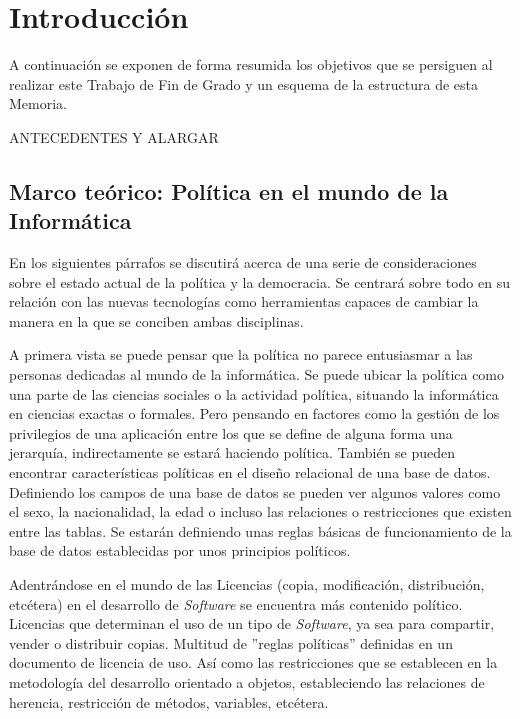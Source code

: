 \newpage
\thispagestyle{sectioned}
\chapter{Introducción}

A continuación se exponen de forma resumida los objetivos que se persiguen al realizar este Trabajo de Fin de Grado y un esquema de la estructura de esta Memoria.

ANTECEDENTES Y ALARGAR

\section{Marco teórico: Política en el mundo de la Informática}

En los siguientes párrafos se discutirá acerca de una serie de consideraciones sobre el estado actual de la política y la democracia. Se centrará sobre todo en su relación con las nuevas tecnologías como herramientas capaces de cambiar la manera en la que se conciben ambas disciplinas.

A primera vista se puede pensar que la política no parece entusiasmar a las personas dedicadas al mundo de la informática. Se puede ubicar la política como una parte de las ciencias sociales o la actividad política, situando la informática en ciencias exactas o formales. Pero pensando en factores como la gestión de los privilegios de una aplicación entre los que se define de alguna forma una jerarquía, indirectamente se estará haciendo política. También se pueden encontrar características políticas en el diseño relacional de una base de datos. Definiendo los campos de una base de datos se pueden ver algunos valores como el sexo, la nacionalidad, la edad o incluso las relaciones o restricciones que existen entre las tablas. Se estarán definiendo unas reglas básicas de funcionamiento de la base de datos establecidas por unos principios políticos.

Adentrándose en el mundo de las Licencias (copia, modificación, distribución, etcétera) en el desarrollo de \textit{Software} se encuentra más contenido político. Licencias que determinan el uso de un tipo de \textit{Software}, ya sea para compartir, vender o distribuir copias. Multitud de ''reglas políticas'' definidas en un documento de licencia de uso. Así como las restricciones que se establecen en la metodología del desarrollo orientado a objetos, estableciendo las relaciones de herencia, restricción de métodos, variables, etcétera.

